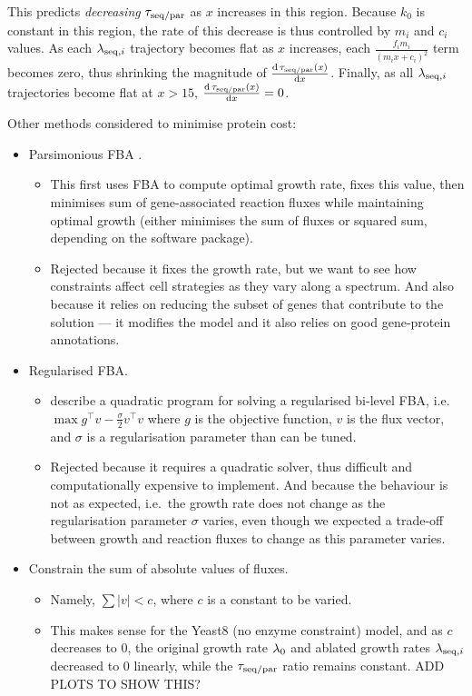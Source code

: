 This predicts \emph{decreasing} $\tau_{\mathrm{seq}/\mathrm{par}}$ as $x$ increases in this region.
Because $k_{0}$ is constant in this region, the rate of this decrease is thus controlled by $m_{i}$ and $c_{i}$ values.
As each $\lambda_{\mathrm{seq},i}$ trajectory becomes flat as $x$ increases, each $\frac{f_{i}m_{i}}{(m_{i}x+c_{i})^{2}}$ term becomes zero, thus shrinking the magnitude of $\frac{\mathrm{d} \, \tau_{\mathrm{seq}/\mathrm{par}}(x)}{\mathrm{d} x}$.
Finally, as all $\lambda_{\mathrm{seq},i}$ trajectories become flat at $x > 15$, $\frac{\mathrm{d} \, \tau_{\mathrm{seq}/\mathrm{par}}(x)}{\mathrm{d} x} = 0$.

Other methods considered to minimise protein cost:
\begin{itemize}
  \item Parsimonious FBA \parencite{lewisOmicDataEvolved2010}.
    \begin{itemize}
      \item This first uses FBA to compute optimal growth rate, fixes this value, then minimises sum of gene-associated reaction fluxes while maintaining optimal growth (either minimises the sum of fluxes or squared sum, depending on the software package).
      \item Rejected because it fixes the growth rate, but we want to see how constraints affect cell strategies as they vary along a spectrum.
        And also because it relies on reducing the subset of genes that contribute to the solution --- it modifies the model and it also relies on good gene-protein annotations.
    \end{itemize}
  \item Regularised FBA.
    \begin{itemize}
      \item \textcite{vijayakumarHybridFluxBalance2020} describe a quadratic program for solving a regularised bi-level FBA, i.e.\: $\max g^\intercal v - \frac{\sigma}{2}v^\intercal v$ where $g$ is the objective function, $v$ is the flux vector, and $\sigma$ is a regularisation parameter than can be tuned.
      \item Rejected because it requires a quadratic solver, thus difficult and computationally expensive to implement.
            And because the behaviour is not as expected, i.e.\ the growth rate does not change as the regularisation parameter $\sigma$ varies, even though we expected a trade-off between growth and reaction fluxes to change as this parameter varies.
    \end{itemize}
  \item Constrain the sum of absolute values of fluxes.
    \begin{itemize}
      \item Namely, $\sum |v| < c$, where $c$ is a constant to be varied.
      \item This makes sense for the Yeast8 (no enzyme constraint) model, and as $c$ decreases to 0, the original growth rate $\lambda_{0}$ and ablated growth rates $\lambda_{\mathrm{seq},i}$ decreased to 0 linearly, while the $\tau_{\mathrm{seq}/\mathrm{par}}$ ratio remains constant.
            ADD PLOTS TO SHOW THIS?
    \end{itemize}
\end{itemize}


